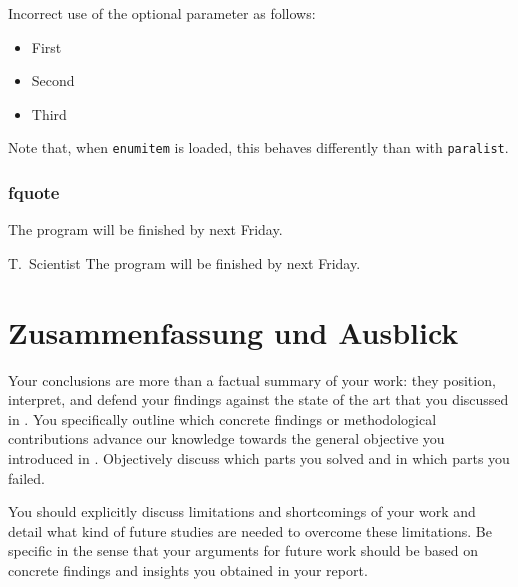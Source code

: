 Incorrect use of the optional parameter as follows:
\begin{itemize}
  \item[first] First
  \item[second] Second
  \item[third] Third
\end{itemize}
Note that, when \texttt{enumitem} is loaded, this behaves differently than with \texttt{paralist}.

\subsection{fquote}

\begin{fquote}[T.\ Scientist]
  The program will be finished by next Friday.
\end{fquote}

\begin{gfquote}{T.\ Scientist}
  The program will be finished by next Friday.
\end{gfquote}

\chapter{Zusammenfassung und Ausblick}\label{sec:conclusion}

Your conclusions are more than a factual summary of your work: they position, interpret, and defend your findings against the state of the art that you discussed in .
You specifically outline which concrete findings or methodological contributions advance our knowledge towards the general objective you introduced in .
Objectively discuss which parts you solved and in which parts you failed.

You should explicitly discuss limitations and shortcomings of your work and detail what kind of future studies are needed to overcome these limitations.
Be specific in the sense that your arguments for future work should be based on concrete findings and insights you obtained in your report.




